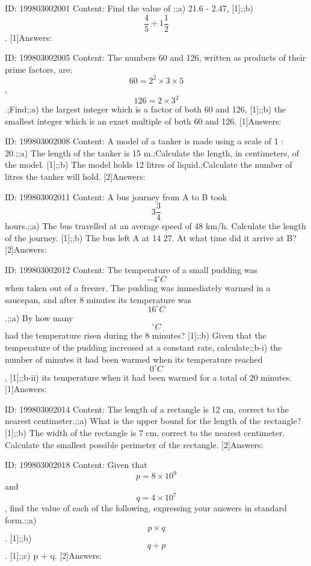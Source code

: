 \documentclass{article}
\begin{document}
ID: 199803002001
Content:
Find the value of ;;a) 21.6  - 2.47, [1];;b) $$\frac{4}{5} \div 1 \frac{1}{2}$$. [1]Answers:

ID: 199803002005
Content:
The numbers 60 and 126, written as products of their prime factors, are;$$60 = 2^2 \times 3 \times 5$$,  $$126 = 2 \times 3^2$$.;Find;;a) the largest integer which is a factor of both 60 and 126, [1];;b) the smallest integer which is an exact multiple of both 60 and 126. [1]Answers:

ID: 199803002008
Content:
A model of a tanker is made using a scale of 1 : 20.;;a) The length of the tanker is 15 m.;Calculate the length, in centimeters, of the model. [1];;b) The model holds 12 litres of liquid.;Calculate the number of litres the tanker will hold. [2]Answers:

ID: 199803002011
Content:
A bus journey from A to B took $$3 \frac{3}{4}$$ hours.;;a) The bus travelled at an average speed of 48 km/h. Calculate the length of the journey. [1];;b) The bus left A at 14 27. At what time did it arrive at B? [2]Answers:

ID: 199803002012
Content:
The temperature of a small pudding was $$-4^{\circ}C$$ when taken out of a freezer. The pudding was immediately warmed in a saucepan, and after 8 minutes its temperature was $$16^{\circ}C$$.;;a) By how many $$^{\circ}C$$ had the temperature risen during the 8 minutes? [1];;b) Given that the temperature of the pudding increased at a constant rate, calculate;;b-i) the number of minutes it had been warmed when its temperature reached $$0^{\circ}C$$, [1];;b-ii) its temperature when it had been warmed for a total of 20 minutes. [1]Answers:

ID: 199803002014
Content:
The length of a rectangle is 12 cm, correct to the nearest centimeter.;;a) What is the upper bound for the length of the rectangle? [1];;b) The width of the rectangle is 7 cm, correct to the nearest centimeter. Calculate the smallest possible perimeter of the rectangle. [2]Answers:

ID: 199803002018
Content:
Given that $$p = 8 \times 10^9$$and $$q = 4 \times 10^7$$, find the value of each of the following, expressing your answers in standard form.;;a) $$p \times q$$. [1];;b) $$q \div p$$. [1];;c) p + q. [2]Answers:
\end{document}
